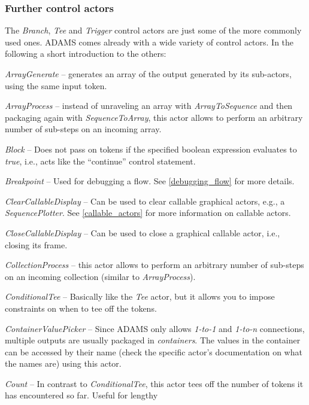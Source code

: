 \subsubsection{Further control actors}
The \textit{Branch}, \textit{Tee} and \textit{Trigger} control actors are just
some of the more commonly used ones. ADAMS comes already with a wide variety of
control actors. In the following a short introduction to the others:
\begin{tight_itemize}
	\item \textit{ArrayGenerate} -- generates an array of the output
	generated by its sub-actors, using the same input token.
	\item \textit{ArrayProcess} -- instead of unraveling an array with
	\textit{ArrayToSequence} and then packaging again with
	\textit{SequenceToArray}, this actor allows to perform an arbitrary number of
	sub-steps on an incoming array.
	\item \textit{Block} -- Does not pass on tokens if the specified boolean
	expression evaluates to \textit{true}, i.e., acts like the ``continue''
	control statement.
	\item \textit{Breakpoint} -- Used for debugging a flow. See
	\ref{debugging_flow} for more details.
	\item \textit{ClearCallableDisplay} -- Can be used to clear callable
	graphical actors, e.g., a \textit{SequencePlotter}. See \ref{callable_actors} for
	more information on callable actors.
	\item \textit{CloseCallableDisplay} -- Can be used to close a graphical
	callable actor, i.e., closing its frame.
	\item \textit{CollectionProcess} -- this actor allows to perform an arbitrary number of
	sub-steps on an incoming collection (similar to \textit{ArrayProcess}).
	\item \textit{ConditionalTee} -- Basically like the \textit{Tee} actor, but it
	allows you to impose constraints on when to tee off the tokens.
	\item \textit{ContainerValuePicker} -- Since ADAMS only allows \textit{1-to-1}
	and \textit{1-to-n} connections, multiple outputs are usually packaged in
	\textit{containers}. The values in the container can be accessed by their name
	(check the specific actor's documentation on what the names are) using this
	actor.
	\item \textit{Count} -- In contrast to \textit{ConditionalTee}, this actor tees
	off the number of tokens it has encountered so far. Useful for lengthy

\end{tight_itemize}
